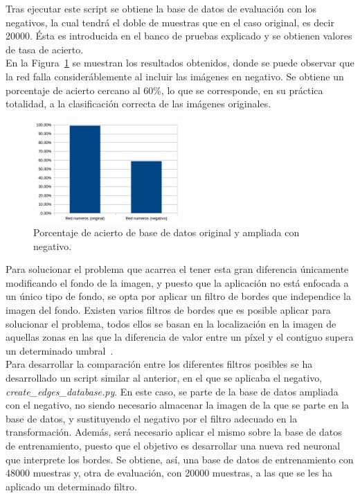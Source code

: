 Tras ejecutar este script se obtiene la base de datos de evaluación con los negativos, la cual tendrá el doble de muestras que en el caso original, es decir 20000. Ésta es introducida en el banco de pruebas explicado y se obtienen valores de tasa de acierto.\\

En la Figura~\ref{fig.neg-orig} se muestran los resultados obtenidos, donde se puede observar que la red falla consideráblemente al incluir las imágenes en negativo. Se obtiene un porcentaje de acierto cercano al 60\%, lo que se corresponde, en su práctica totalidad, a la clasificación correcta de las imágenes originales.

\begin{figure}[H]
	\begin{center}
		\includegraphics[width=0.5\textwidth]{figures/orig_neg}
		\caption{Porcentaje de acierto de base de datos original y ampliada con negativo.}
		\label{fig.neg-orig}
	\end{center}
\end{figure}

Para solucionar el problema que acarrea el tener esta gran diferencia únicamente modificando el fondo de la imagen, y puesto que la aplicación no está enfocada a un único tipo de fondo, se opta por aplicar un filtro de bordes que independice la imagen del fondo. Existen varios filtros de bordes que es posible aplicar para solucionar el problema, todos ellos se basan en la localización en la imagen de aquellas zonas en las que la diferencia de valor entre un píxel y el contiguo supera un determinado umbral~\cite{fundamentos}.\\

Para desarrollar la comparación entre los diferentes filtros posibles se ha desarrollado un script similar al anterior, en el que se aplicaba el negativo, \textit{create\_edges\_database.py}. En este caso, se parte de la base de datos ampliada con el negativo, no siendo necesario almacenar la imagen de la que se parte en la base de datos, y sustituyendo el negativo por el filtro adecuado en la transformación. Además, será necesario aplicar el mismo sobre la base de datos de entrenamiento, puesto que el objetivo es desarrollar una nueva red neuronal que interprete los bordes. Se obtiene, así, una base de datos de entrenamiento con 48000 muestras y, otra de evaluación, con 20000 muestras, a las que se les ha aplicado un determinado filtro.\\

